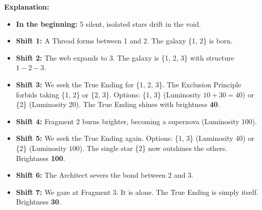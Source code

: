 \documentclass[11pt, letterpaper]{article}
\begin{document}
\textbf{Explanation:}
\begin{itemize}
    \item \textbf{In the beginning:} 5 silent, isolated stars drift in the void.
    \item \textbf{Shift 1:} A Thread forms between 1 and 2. The galaxy \{1, 2\} is born.
    \item \textbf{Shift 2:} The web expands to 3. The galaxy is \{1, 2, 3\} with structure $1-2-3$.
    \item \textbf{Shift 3:} We seek the True Ending for \{1, 2, 3\}. 
    The Exclusion Principle forbids taking \{1, 2\} or \{2, 3\}.
    Options: \{1, 3\} (Luminosity $10+30=40$) or \{2\} (Luminosity $20$).
    The True Ending shines with brightness \textbf{40}.
    \item \textbf{Shift 4:} Fragment 2 burns brighter, becoming a supernova (Luminosity 100).
    \item \textbf{Shift 5:} We seek the True Ending again.
    Options: \{1, 3\} (Luminosity $40$) or \{2\} (Luminosity $100$).
    The single star \{2\} now outshines the others. Brightness \textbf{100}.
    \item \textbf{Shift 6:} The Architect severs the bond between 2 and 3.
    \item \textbf{Shift 7:} We gaze at Fragment 3. It is alone. The True Ending is simply itself. Brightness \textbf{30}.
\end{itemize}
\end{document}
